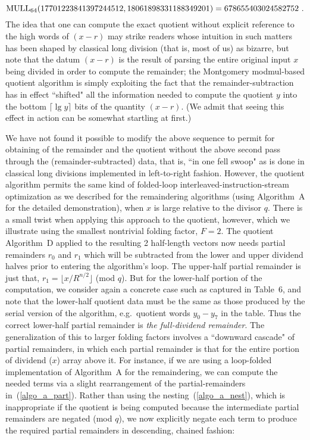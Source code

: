 \documentclass{article}
\begin{document}
$$
	{\rm MULL_{64}}(17701223841397244512, 18061898331188349201) = 678655403024582752\ .
$$
The idea that one can compute the exact quotient without explicit reference to the high words of $(x - r)$ may strike readers whose intuition in such matters has been shaped by classical long division (that is, most of us) as bizarre, but note that the datum $(x - r)$ is the result of parsing the entire original input $x$ being divided in order to compute the remainder; the Montgomery modmul-based quotient algorithm is simply exploiting the fact that the remainder-subtraction has in effect ``shifted" all the information needed to compute the quotient $y$ into the bottom $\lceil \lg y \rceil$ bits of the quantity $(x - r)$. (We admit that seeing this effect in action can be somewhat startling at first.)

We have not found it possible to modify the above sequence to permit for obtaining of the remainder and the quotient without the above second pass through the (remainder-subtracted) data, that is, ``in one fell swoop" as is done in classical long divisions implemented in left-to-right fashion. However, the quotient algorithm permits the same kind of folded-loop interleaved-instruction-stream optimization as we described for the remaindering algorithms (using Algorithm~A for the detailed demonstration), when $x$ is large relative to the divisor $q$. There is a small twist when applying this approach to the quotient, however, which we illustrate using the smallest nontrivial folding factor, $F=2$. The quotient Algorithm~D applied to the resulting 2 half-length vectors now needs partial remainders $r_0$ and $r_1$ which will be subtracted from the lower and upper dividend halves prior to entering the algorithm's loop. The upper-half partial remainder is just that, $r_1 = \lfloor x/R^{n/2} \rfloor$ (mod $q$). But for the lower-half portion of the computation, we consider again a concrete case such as captured in Table~6, and note that the lower-half quotient data must be the same as those produced by the serial version of the algorithm, e.g.~quotient words $y_0-y_7$ in the table. Thus the correct lower-half partial remainder is {\em the full-dividend remainder}. The generalization of this to larger folding factors involves a ``downward cascade" of partial remainders, in which each partial remainder is that for the entire portion of dividend ($x$) array above it. For instance, if we are using a loop-folded implementation of Algorithm~A for the remaindering, we can compute the needed terms via a slight rearrangement of the partial-remainders in~(\ref{algo_a_part}). Rather than using the nesting~(\ref{algo_a_nest}), which is inappropriate if the quotient is being computed because the intermediate partial remainders are negated (mod $q$), we now explicitly negate each term to produce the required partial remainders in descending, chained fashion:
\end{document}
